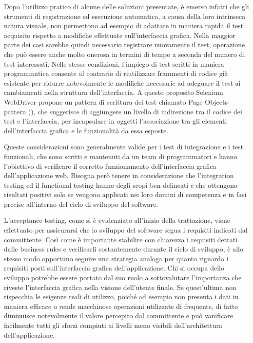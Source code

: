 Dopo l'utilizzo pratico di alcune delle soluzioni presentate, è emerso infatti che gli strumenti di registrazione ed esecuzione automatica, a causa della loro intrinseca natura visuale, non permettono ad esempio di adattare in maniera rapida il test acquisito rispetto a modifiche effettuate sull'interfaccia grafica. Nella maggior parte dei casi sarebbe quindi necessario registrare nuovamente il test, operazione che può essere anche molto onerosa in termini di tempo a seconda del numero di test interessati. Nelle stesse condizioni, l'impiego di test scritti in maniera programmatica consente al contrario di riutilizzare frammenti di codice già esistente per ridurre notevolmente le modifiche necessarie ad adeguare il test ai cambiamenti nella struttura dell'interfaccia. A questo proposito Selenium WebDriver propone un pattern di scrittura dei test chiamato Page Objects pattern (\cite{pageObject}), che suggerisce di aggiungere un livello di indirezione tra il codice dei test e l'interfaccia, per incapsulare in oggetti l'associazione tra gli elementi dell'interfaccia grafica e le funzionalità da essa esposte.

Queste considerazioni sono generalmente valide per i test di integrazione e i test funzionali, che sono scritti e mantenuti da un team di programmatori e hanno l'obiettivo di verificare il corretto funzionamento dell'interfaccia grafica dell'applicazione web. Bisogna però tenere in considerazione che l'integration testing ed il functional testing hanno degli scopi ben delineati e che ottengono risultati positivi solo se vengono applicati nei loro domini di competenza e in fasi precise all'interno del ciclo di sviluppo del software. 

L'acceptance testing, come si è evidenziato all'inizio della trattazione, viene effettuato per assicurarsi che lo sviluppo del software segua i requisiti indicati dal committente. Così come è importante stabilire con chiarezza i requisiti dettati dalle business rules e verificarli costantemente durante il ciclo di sviluppo, è allo stesso modo opportuno seguire una strategia analoga per quanto riguarda i requisiti posti sull'interfaccia grafica dell'applicazione.  
Chi si occupa dello sviluppo potrebbe essere portato dal suo ruolo a sottovalutare l'importanza che riveste l'interfaccia grafica nella visione dell'utente finale. Se quest'ultima non rispecchia le esigenze reali di utilizzo, poiché ad esempio non presenta i dati in maniera efficace o rende macchinose operazioni utilizzate di frequente, di fatto diminuisce notevolmente il valore percepito dal committente e può vanificare facilmente tutti gli sforzi compiuti ai livelli meno visibili dell'architettura dell'applicazione. 

